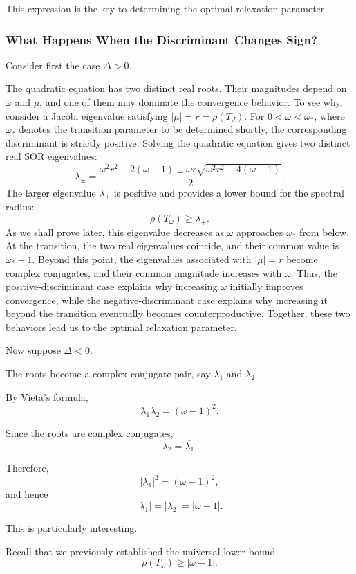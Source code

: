 \documentclass[11pt,a4paper]{article}
\theoremstyle{definition}
\theoremstyle{remark}
\begin{document}
This expression is the key to determining
the optimal relaxation parameter.


\subsubsection*{What Happens When the Discriminant Changes Sign?}

Consider first the case $\Delta>0$.

The quadratic equation has two distinct
real roots. Their magnitudes depend on
$\omega$ and $\mu$, and one of them may
dominate the convergence behavior.
To see why,
consider a Jacobi eigenvalue satisfying
$|\mu|=r=\rho(T_J)$. For
$0<\omega<\omega_*$, where $\omega_*$ denotes
the transition parameter to be determined
shortly, the corresponding discriminant
is strictly positive. Solving the quadratic
equation gives two distinct real SOR
eigenvalues:
\[
\lambda_{\pm}
=
\frac{
\omega^2r^2-2(\omega-1)
\pm
\omega r
\sqrt{\omega^2r^2-4(\omega-1)}
}{2}.
\]
The larger eigenvalue $\lambda_+$ is
positive and provides a lower bound for
the spectral radius:
\[
    \rho(T_\omega)\geq\lambda_+.
\]
As we shall prove later, this eigenvalue
decreases as $\omega$ approaches
$\omega_*$ from below. At the transition,
the two real eigenvalues coincide, and
their common value is $\omega_*-1$.
Beyond this point, the eigenvalues
associated with $|\mu|=r$ become complex
conjugates, and their common magnitude
increases with $\omega$. Thus, the
positive-discriminant case explains
why increasing $\omega$ initially
improves convergence, while the
negative-discriminant case explains
why increasing it beyond the transition
eventually becomes counterproductive.
Together, these two behaviors lead
us to the optimal relaxation parameter.


Now suppose $\Delta<0$.

The roots become a complex conjugate pair,
say $\lambda_1$ and $\lambda_2$.

By Vieta's formula,
\[
    \lambda_1\lambda_2=(\omega-1)^2.
\]

Since the roots are complex conjugates,
\[
    \lambda_2=\overline{\lambda_1}.
\]

Therefore,
\[
    |\lambda_1|^2=(\omega-1)^2,
\]
and hence
\begin{equation}
    \boxed{
    |\lambda_1|=|\lambda_2|=|\omega-1|.
    }
\end{equation}

This is particularly interesting.

Recall that we previously established
the universal lower bound
\[
    \rho(T_\omega)\geq|\omega-1|.
\]
\end{document}
